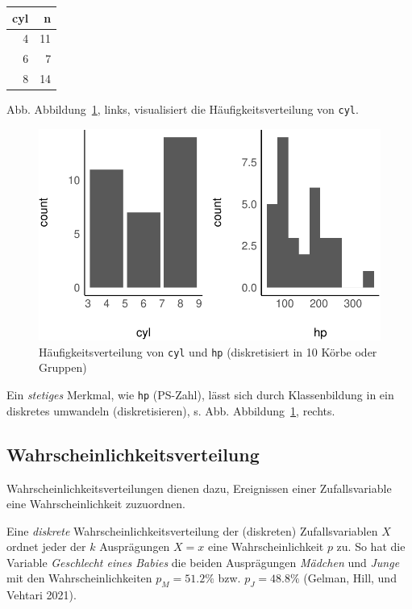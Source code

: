 \documentclass[
  a4paper,
  DIV=11]{scrreprt}
\theoremstyle{definition}
\theoremstyle{remark}
\begin{document}
\begin{longtable}[]{@{}rr@{}}
\toprule()
cyl & n \\
\midrule()
\endhead
4 & 11 \\
6 & 7 \\
8 & 14 \\
\bottomrule()
\end{longtable}

Abb. Abbildung~\ref{fig-mtcars-freq}, links, visualisiert die
Häufigkeitsverteilung von \texttt{cyl}.

\begin{figure}

{\centering \includegraphics{./Verteilungen_files/figure-pdf/fig-mtcars-freq-1.pdf}

}

\caption{\label{fig-mtcars-freq}Häufigkeitsverteilung von \texttt{cyl}
und \texttt{hp} (diskretisiert in 10 Körbe oder Gruppen)}

\end{figure}

Ein \emph{stetiges} Merkmal, wie \texttt{hp} (PS-Zahl), lässt sich durch
Klassenbildung in ein diskretes umwandeln (diskretisieren), s. Abb.
Abbildung~\ref{fig-mtcars-freq}, rechts.

\hypertarget{wahrscheinlichkeitsverteilung}{%
\subsection{Wahrscheinlichkeitsverteilung}\label{wahrscheinlichkeitsverteilung}}

Wahrscheinlichkeitsverteilungen dienen dazu, Ereignissen einer
Zufallsvariable eine Wahrscheinlichkeit zuzuordnen.

Eine \emph{diskrete} Wahrscheinlichkeitsverteilung der (diskreten)
Zufallsvariablen \(X\) ordnet jeder der \(k\) Ausprägungen \(X=x\) eine
Wahrscheinlichkeit \(p\) zu. So hat die Variable \emph{Geschlecht eines
Babies} die beiden Ausprägungen \emph{Mädchen} und \emph{Junge} mit den
Wahrscheinlichkeiten \(p_M = 51.2\%\) bzw. \(p_J = 48.8\%\) (Gelman,
Hill, und Vehtari 2021).
\end{document}
